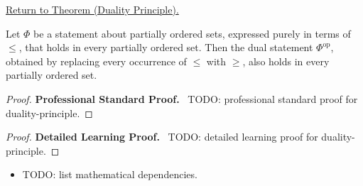 \newpage
{}
\label{prf:duality-principle}

\begin{remark*}[Return]
\hyperref[prop:duality-principle]{Return to Theorem (Duality Principle).}
\end{remark*}

\begin{theorem*}
Let $\Phi$ be a statement about partially ordered sets, expressed purely
in terms of $\leq$, that holds in every partially ordered set.  Then the
dual statement $\Phi^{\mathrm{op}}$, obtained by replacing every
occurrence of $\leq$ with $\geq$, also holds in every partially ordered
set.
\end{theorem*}

\begin{proof}
\textbf{Professional Standard Proof.}~
TODO: professional standard proof for duality-principle.
\end{proof}

\begin{proof}
\textbf{Detailed Learning Proof.}~
TODO: detailed learning proof for duality-principle.
\end{proof}

\begin{remark*}
\end{remark*}

\begin{dependencies}
\begin{itemize}
  \item TODO: list mathematical dependencies.
\end{itemize}
\end{dependencies}

\clearpage
